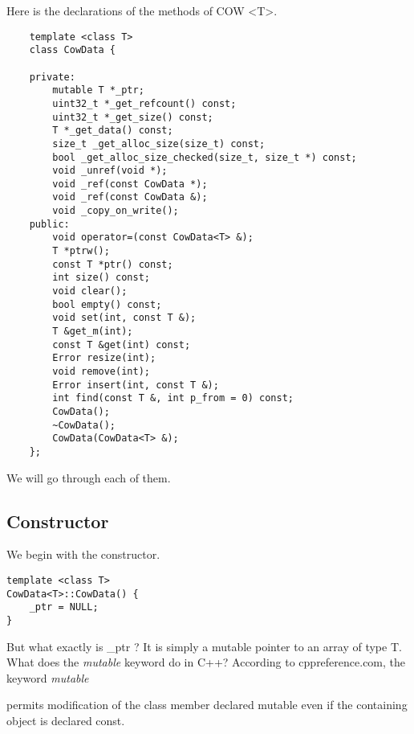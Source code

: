 \documentclass[a4paper,12pt]{book}
\begin{document}
Here is the declarations of the methods of COW  \textless T\textgreater.
\begin{lstlisting}
    template <class T>
    class CowData {
    
    private:
        mutable T *_ptr;
        uint32_t *_get_refcount() const;
        uint32_t *_get_size() const;
        T *_get_data() const;
        size_t _get_alloc_size(size_t) const;
        bool _get_alloc_size_checked(size_t, size_t *) const;
        void _unref(void *);
        void _ref(const CowData *);
        void _ref(const CowData &);
        void _copy_on_write();
    public:
        void operator=(const CowData<T> &);
        T *ptrw();
        const T *ptr() const;
        int size() const;
        void clear();
        bool empty() const;
        void set(int, const T &);
        T &get_m(int);
        const T &get(int) const;
        Error resize(int);
        void remove(int);
        Error insert(int, const T &);
        int find(const T &, int p_from = 0) const;
        CowData();
        ~CowData();
        CowData(CowData<T> &);
    };
\end{lstlisting}

We will go through each of them.

\subsection{Constructor}

We begin with the constructor.

\begin{lstlisting}
template <class T>
CowData<T>::CowData() {
	_ptr = NULL;
}
\end{lstlisting}

But what exactly is \_ptr ? It is simply a mutable pointer to an array of type T.
What does the \textit{mutable} keyword do in C++?
According to cppreference.com, the keyword \textit{mutable}

permits modification of the class member declared mutable even if the containing object is declared const. 
\end{document}
